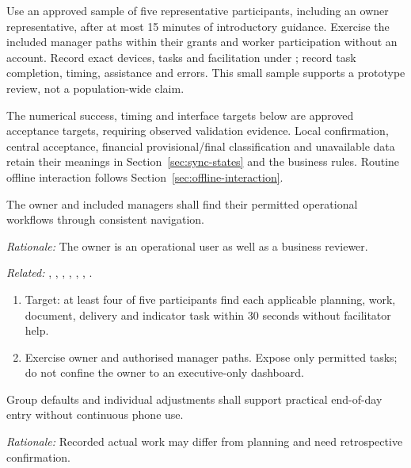 Use an approved sample of five representative participants, including an owner
representative, after at most 15 minutes of introductory guidance. Exercise the
included manager paths within their grants and worker participation without an
account. Record exact devices, tasks and facilitation under
; record task completion, timing, assistance and errors.
This small sample supports a prototype review, not a population-wide claim.

The numerical success, timing and interface targets below are approved acceptance
targets, requiring observed validation evidence. Local confirmation, central acceptance, financial provisional/final
classification and unavailable data retain their meanings in Section~\ref{sec:sync-states}
and the business rules. Routine offline interaction follows
Section~\ref{sec:offline-interaction}.

\label{nfr:USA-01}
The owner and included managers shall find their permitted operational workflows through consistent navigation.

\textit{Rationale:} The owner is an operational user as well as a business reviewer.

\textit{Related:} \hyperref[fr:007]{}, \hyperref[fr:024]{}, \hyperref[fr:028]{}, \hyperref[fr:030]{}, \hyperref[fr:038]{}, \hyperref[fr:046]{}, \hyperref[fr:055]{}.
\begin{enumerate}[label=(\alph*),leftmargin=*,itemsep=1pt,topsep=3pt]
\item Target: at least four of five participants find each applicable planning, work, document, delivery and indicator task within 30 seconds without facilitator help.
\item Exercise owner and authorised manager paths. Expose only permitted tasks; do not confine the owner to an executive-only dashboard.
\end{enumerate}

\label{nfr:USA-02}
Group defaults and individual adjustments shall support practical end-of-day entry without continuous phone use.

\textit{Rationale:} Recorded actual work may differ from planning and need retrospective confirmation.

